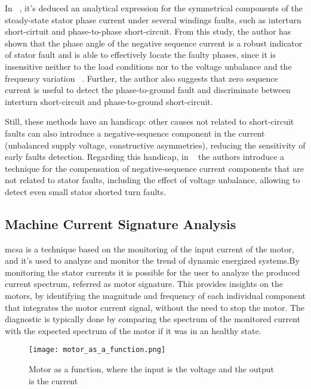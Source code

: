 In ~\cite{Bouzid2013}, it's deduced an analytical expression for the symmetrical components of the steady-state stator phase current under several windings faults, such as interturn short-cirtuit and phase-to-phase short-circuit. From this study, the author has shown that the phase angle of the negative sequence current is a robust indicator of stator fault and is able to effectively locate the faulty phases, since it is insensitive neither to the load conditions nor to the voltage unbalance and the frequency variation ~\cite{Bouzid2013}. Further, the author also suggests that zero sequence current is useful to detect the phase-to-ground fault and discriminate between interturn short-circuit and phase-to-ground short-circuit.


Still, these methods have an handicap: other causes not related to short-circuit faults can also introduce a negative-sequence component in the current (unbalanced supply voltage, constructive asymmetries), reducing the sensitivity of early faults detection. Regarding this handicap, in ~\cite{Bakhri2012} the authors introduce a technique for the compensation of negative-sequence current components that are not related to stator faults, including the effect of voltage unbalance, allowing to detect even small stator shorted turn faults.  



\subsection{Machine Current Signature Analysis} %
\label{subsec:mcsa}
\acrfull{mcsa} is a technique based on the monitoring of the input current of the motor, and it's used to analyze and monitor the trend of dynamic energized systems.By monitoring the stator currents it is possible for the user to analyze the produced current spectrum, referred as motor signature. This provides insights on the motors, by identifying the magnitude and frequency of each individual component that integrates the motor current signal, without the need to stop the motor. The diagnostic is typically done by comparing the spectrum of the monitored current with the expected spectrum of the motor if it was in an healthy state.

\begin{figure}[htpb]
\centering
\texttt{[image: motor\_as\_a\_function.png]}
\caption{Motor as a function, where the input is the voltage and the output is the current}
\label{fig:motor_transducer}
\end{figure}

